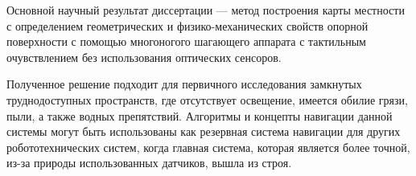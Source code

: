
Основной научный результат диссертации --- метод построения карты местности с определением геометрических и физико-механических свойств опорной поверхности с помощью многоногого шагающего аппарата с тактильным очувствлением без использования оптических сенсоров.

Полученное решение подходит для первичного исследования замкнутых труднодоступных пространств, где отсутствует освещение, имеется обилие грязи, пыли, а также водных препятствий. Алгоритмы и концепты навигации данной системы могут быть использованы как резервная система навигации для других робототехнических систем, когда главная система, которая является более точной, из-за природы использованных датчиков, вышла из строя.

